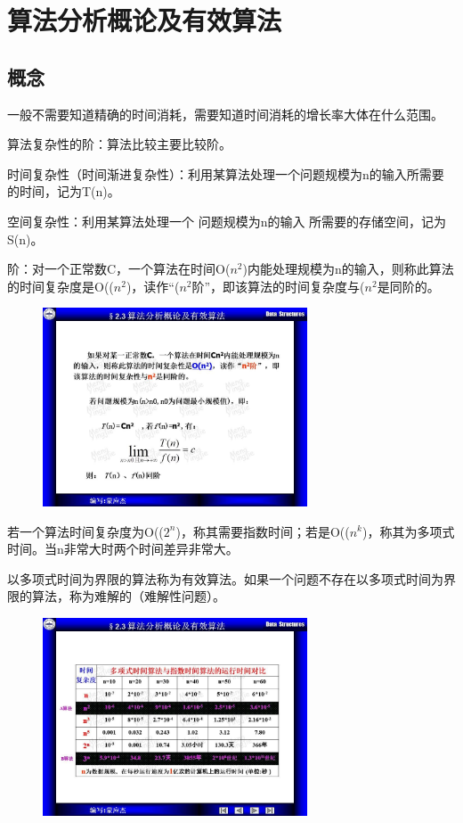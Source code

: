 \documentclass[AutoFakeBold]{LZUThesis2007}
\begin{document}
	\section{算法分析概论及有效算法}
		\subsection{概念}

			一般不需要知道精确的时间消耗，需要知道时间消耗的增长率大体在什么范围。

			算法复杂性的阶：算法比较主要比较阶。

			时间复杂性（时间渐进复杂性）：利用某算法处理一个问题规模为n的输入所需要的时间，记为T(n)。

			空间复杂性：利用某算法处理一个 问题规模为n的输入 所需要的存储空间，记为S(n)。

			阶：对一个正常数C，一个算法在时间Ο($n^{2}$)内能处理规模为n的输入，则称此算法的时间复杂度是Ο(($n^{2}$)，读作“($n^{2}$阶”，即该算法的时间复杂度与($n^{2}$是同阶的。

			\begin{figure}[H]
			    \centering
			    \includegraphics[width=0.7\textwidth]{figures/2.1.jpg}
			    
			    \label{fig_install_texlive}
			\end{figure}

			若一个算法时间复杂度为O(($2^{n}$)，称其需要指数时间；若是O(($n^{k}$)，称其为多项式时间。当n非常大时两个时间差异非常大。

			以多项式时间为界限的算法称为有效算法。如果一个问题不存在以多项式时间为界限的算法，称为难解的（难解性问题）。

			\begin{figure}[H]
			    \centering
			    \includegraphics[width=0.7\textwidth]{figures/2.2.jpg}
			    
			    \label{fig_install_texlive}
			\end{figure}
\end{document}
